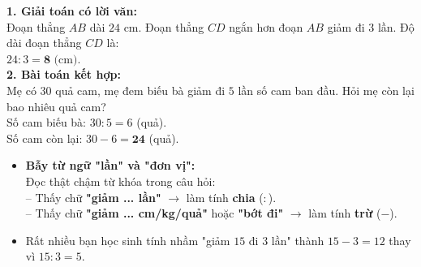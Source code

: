 \documentclass[11pt,a4paper]{article}
\begin{document}
\vspace{-2.5mm}
\noindent
\begin{minipage}[t]{0.49\textwidth}\vspace{0pt}
\begin{tcolorbox}[
  enhanced,
  colback=green!4!white,
  colframe=green!60!black,
  arc=2mm, boxrule=0.8pt,
  left=2mm, right=2mm, top=1.8mm, bottom=1.8mm,
  title={\footnotesize\bfseries\color{white}\faCheckCircle\ Ví dụ thực hành chuẩn mực}
]
{\footnotesize
\textbf{1. Giải toán có lời văn:}\\
Đoạn thẳng $AB$ dài $24\text{ cm}$. Đoạn thẳng $CD$ ngắn hơn đoạn $AB$ giảm đi $3$ lần. Độ dài đoạn thẳng $CD$ là:\\
\phantom{Lời giải: }$24 : 3 = \mathbf{8}\text{ (cm)}$.\\
\textbf{2. Bài toán kết hợp:}\\
Mẹ có $30$ quả cam, mẹ đem biếu bà giảm đi $5$ lần số cam ban đầu. Hỏi mẹ còn lại bao nhiêu quả cam?\\
Số cam biếu bà: $30 : 5 = 6$ (quả).\\
Số cam còn lại: $30 - 6 = \mathbf{24}$ (quả).
}
\end{tcolorbox}
\end{minipage}
\hfill
\begin{minipage}[t]{0.49\textwidth}\vspace{0pt}
\begin{tcolorbox}[
  enhanced,
  colback=red!4!white,
  colframe=red!70!black,
  arc=2mm, boxrule=0.8pt,
  left=2mm, right=2mm, top=1.8mm, bottom=1.8mm,
  title={\footnotesize\bfseries\color{white}\faExclamationTriangle\ Mẹo tránh bẫy trắc nghiệm}
]
{\footnotesize
\begin{itemize}\setlength{\itemsep}{1.5pt}\setlength{\leftskip}{-2.5mm}
  \item \textbf{Bẫy từ ngữ "lần" và "đơn vị":}\\
  Đọc thật chậm từ khóa trong câu hỏi:\\
  -- Thấy chữ \textbf{"giảm ... lần"} $\to$ làm tính \textbf{chia} ($:$).\\
  -- Thấy chữ \textbf{"giảm ... cm/kg/quả"} hoặc \textbf{"bớt đi"} $\to$ làm tính \textbf{trừ} ($-$).
  \item Rất nhiều bạn học sinh tính nhầm "giảm $15$ đi $3$ lần" thành $15 - 3 = 12$ thay vì $15 : 3 = 5$.
\end{itemize}
}
\end{tcolorbox}
\end{minipage}
\end{document}

